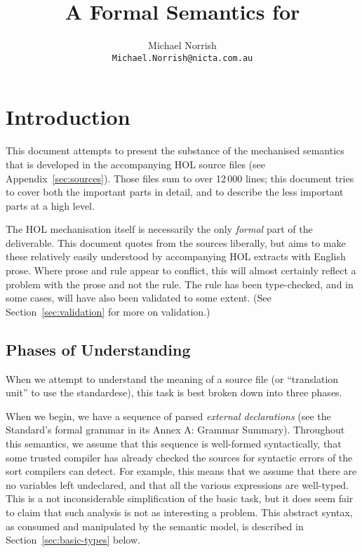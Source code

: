 \documentclass[11pt]{article}
\title{A Formal Semantics for \cpp}
\author{Michael Norrish\\{\small \texttt{Michael.Norrish@nicta.com.au}}}
\date{}
\begin{document}
\maketitle
\tableofcontents

\section{Introduction}

This document attempts to present the substance of the mechanised
\cpp{} semantics that is developed in the accompanying HOL source
files (see Appendix~\ref{sec:sources}).  Those files sum to over
12$\,$000 lines; this document tries to cover both the important parts
in detail, and to describe the less important parts at a high level.

The HOL mechanisation itself is necessarily the only \emph{formal}
part of the deliverable.  This document quotes from the sources
liberally, but aims to make these relatively easily understood by
accompanying HOL extracts with English prose.  Where prose and rule
appear to conflict, this will almost certainly reflect a problem with
the prose and not the rule.  The rule has been type-checked, and in
some cases, will have also been validated to some extent.  (See
Section~\ref{sec:validation} for more on validation.)


\subsection{Phases of Understanding}

When we attempt to understand the meaning of a \cpp{} source file (or
``translation unit'' to use the standardese), this task is best broken
down into three phases.

When we begin, we have a sequence of parsed \emph{external
  declarations} (see the Standard's formal grammar in its Annex A:
Grammar Summary).  Throughout this semantics, we assume that this
sequence is well-formed syntactically, that some trusted compiler has
already checked the sources for syntactic errors of the sort compilers
can detect.  For example, this means that we assume that there are no
variables left undeclared, and that all the various expressions are
well-typed.  This is a not inconsiderable simplification of the basic
task, but it does seem fair to claim that such analysis is not as
interesting a problem.  This abstract syntax, as consumed and
manipulated by the semantic model, is described in
Section~\ref{sec:basic-types} below.
\end{document}
